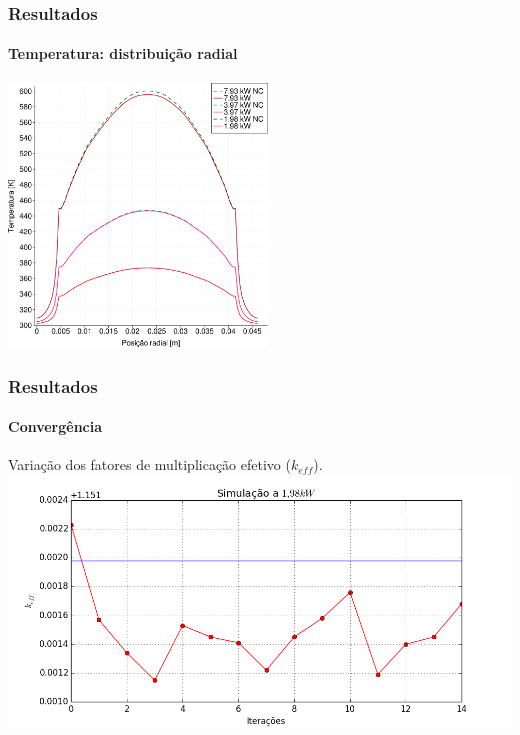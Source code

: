 \documentclass[svgnames,smaller,table]{beamer}
\begin{document}
\begin{frame}
  \frametitle{Resultados}
  \framesubtitle{Temperatura: distribuição radial}
  \centering\includegraphics[width=\textwidth, height=7.0cm]{../figuras/T_x_all_square_port.png}
  \label{fig:keff50}
\end{frame}

\begin{frame}
  \frametitle{Resultados}
  \framesubtitle{Convergência}
  Variação dos fatores de multiplicação efetivo ($k_{eff}$).
  \centering\includegraphics[scale=0.45]{../figuras/plot50.png}
  \label{fig:keff50}
\end{frame}
\end{document}
